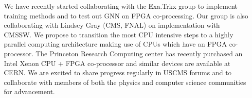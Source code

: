 \documentclass[preprint,12pt]{elsarticle}
\begin{document}
We have recently started collaborating with the Exa.Trkx group to implement training methods
and to test out GNN on FPGA co-processing.
Our group is also collaborating with Lindsey Gray (CMS, FNAL) on implementation with CMSSW.
We propose to transition the most CPU intensive steps %
to a highly parallel computing architecture making use of CPUs which have an FPGA co-processor.
The Princeton Research Computing center has recently purchased an Intel Xenon CPU + FPGA co-processor
and similar devices are available at CERN. We are excited to share progress regularly 
in USCMS forums and to collaborate with members of both the physics and computer science communities
for advancement. 



\end{document}
